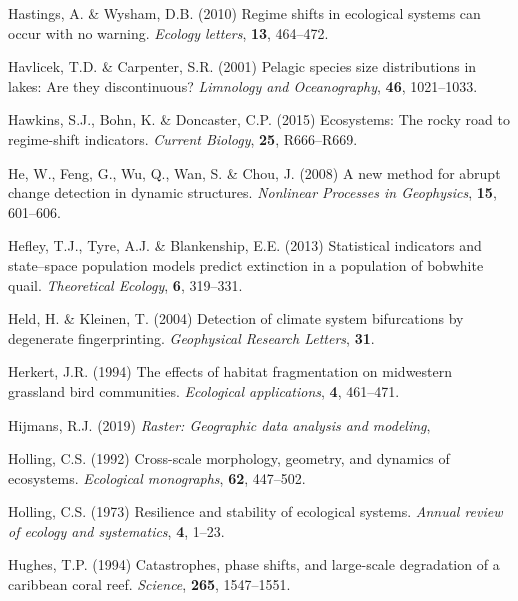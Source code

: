 \documentclass[12pt,twoside,openany]{reedthesis}
\begin{document}
\leavevmode\hypertarget{ref-hastings2010regime}{}%
Hastings, A. \& Wysham, D.B. (2010) Regime shifts in ecological systems can occur with no warning. \emph{Ecology letters}, \textbf{13}, 464--472.

\leavevmode\hypertarget{ref-havlicek2001pelagic}{}%
Havlicek, T.D. \& Carpenter, S.R. (2001) Pelagic species size distributions in lakes: Are they discontinuous? \emph{Limnology and Oceanography}, \textbf{46}, 1021--1033.

\leavevmode\hypertarget{ref-hawkins2015ecosystems}{}%
Hawkins, S.J., Bohn, K. \& Doncaster, C.P. (2015) Ecosystems: The rocky road to regime-shift indicators. \emph{Current Biology}, \textbf{25}, R666--R669.

\leavevmode\hypertarget{ref-he2008new}{}%
He, W., Feng, G., Wu, Q., Wan, S. \& Chou, J. (2008) A new method for abrupt change detection in dynamic structures. \emph{Nonlinear Processes in Geophysics}, \textbf{15}, 601--606.

\leavevmode\hypertarget{ref-hefley2013statistical}{}%
Hefley, T.J., Tyre, A.J. \& Blankenship, E.E. (2013) Statistical indicators and state--space population models predict extinction in a population of bobwhite quail. \emph{Theoretical Ecology}, \textbf{6}, 319--331.

\leavevmode\hypertarget{ref-held2004detection}{}%
Held, H. \& Kleinen, T. (2004) Detection of climate system bifurcations by degenerate fingerprinting. \emph{Geophysical Research Letters}, \textbf{31}.

\leavevmode\hypertarget{ref-herkert1994effects}{}%
Herkert, J.R. (1994) The effects of habitat fragmentation on midwestern grassland bird communities. \emph{Ecological applications}, \textbf{4}, 461--471.

\leavevmode\hypertarget{ref-raster}{}%
Hijmans, R.J. (2019) \emph{Raster: Geographic data analysis and modeling},

\leavevmode\hypertarget{ref-holling1992cross}{}%
Holling, C.S. (1992) Cross-scale morphology, geometry, and dynamics of ecosystems. \emph{Ecological monographs}, \textbf{62}, 447--502.

\leavevmode\hypertarget{ref-holling1973resilience}{}%
Holling, C.S. (1973) Resilience and stability of ecological systems. \emph{Annual review of ecology and systematics}, \textbf{4}, 1--23.

\leavevmode\hypertarget{ref-hughes_catastrophes_1994}{}%
Hughes, T.P. (1994) Catastrophes, phase shifts, and large-scale degradation of a caribbean coral reef. \emph{Science}, \textbf{265}, 1547--1551.
\end{document}
